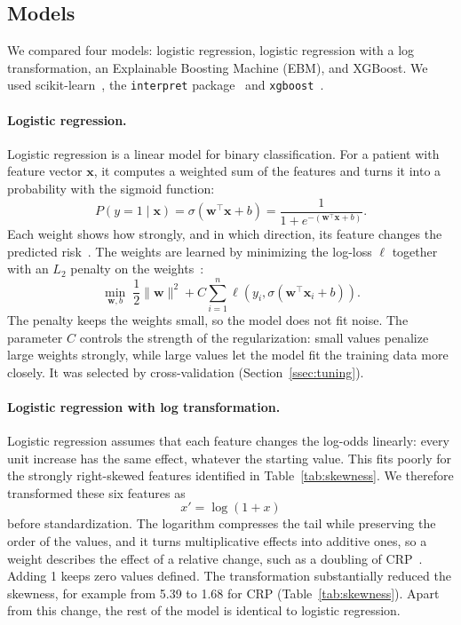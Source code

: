 \documentclass[conference]{IEEEtran}
\begin{document}
\subsection{Models}
\label{ssec:models}

We compared four models: logistic regression, logistic regression with a log
transformation, an Explainable Boosting Machine (EBM), and XGBoost. We used
scikit-learn~\cite{pedregosa2011sklearn}, the \texttt{interpret}
package~\cite{nori2019interpretml} and \texttt{xgboost}~\cite{chen2016xgboost}.

\paragraph{Logistic regression.}
Logistic regression is a linear model for binary classification. For a patient
with feature vector $\mathbf{x}$, it computes a weighted sum of the features
and turns it into a probability with the sigmoid function:
\begin{equation}
P(y = 1 \mid \mathbf{x}) = \sigma(\mathbf{w}^\top \mathbf{x} + b)
  = \frac{1}{1 + e^{-(\mathbf{w}^\top \mathbf{x} + b)}}.
\end{equation}
Each weight shows how strongly, and in which direction, its feature changes the
predicted risk~\cite{hosmer2013applied}. The weights are learned by minimizing
the log-loss $\ell$ together with an $L_2$ penalty on the
weights~\cite{hoerl1970ridge}:
\begin{equation}
\min_{\mathbf{w}, b} \; \frac{1}{2}\lVert \mathbf{w} \rVert^2
  + C \sum_{i=1}^{n} \ell\left(y_i, \sigma(\mathbf{w}^\top \mathbf{x}_i + b)\right).
\end{equation}
The penalty keeps the weights small, so the model does not fit noise. 
The parameter $C$ controls the strength of the regularization: small values
penalize large weights strongly, while large values let the model fit the
training data more closely. It was selected by cross-validation
(Section~\ref{ssec:tuning}).

\paragraph{Logistic regression with log transformation.}
Logistic regression assumes that each feature changes the log-odds linearly:
every unit increase has the same effect, whatever the starting value. This
fits poorly for the strongly right-skewed features identified in
Table~\ref{tab:skewness}. We therefore transformed these six features as
\begin{equation}
x' = \log(1 + x)
\end{equation}
before standardization. The logarithm compresses the tail while preserving the
order of the values, and it turns multiplicative effects into additive ones,
so a weight describes the effect of a relative change, such as a doubling of
CRP~\cite{mlm_logarithms}. Adding 1 keeps zero values defined. The
transformation substantially reduced the skewness, for example from 5.39 to
1.68 for CRP (Table~\ref{tab:skewness}). Apart from this change, the rest of the model is identical to logistic regression.
\end{document}
